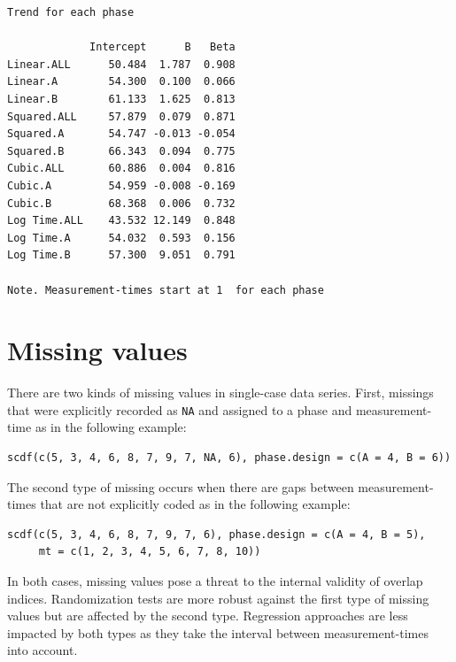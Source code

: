 \documentclass[
]{book}
\begin{document}
\begin{verbatim}
Trend for each phase

             Intercept      B   Beta
Linear.ALL      50.484  1.787  0.908
Linear.A        54.300  0.100  0.066
Linear.B        61.133  1.625  0.813
Squared.ALL     57.879  0.079  0.871
Squared.A       54.747 -0.013 -0.054
Squared.B       66.343  0.094  0.775
Cubic.ALL       60.886  0.004  0.816
Cubic.A         54.959 -0.008 -0.169
Cubic.B         68.368  0.006  0.732
Log Time.ALL    43.532 12.149  0.848
Log Time.A      54.032  0.593  0.156
Log Time.B      57.300  9.051  0.791

Note. Measurement-times start at 1  for each phase
\end{verbatim}

\hypertarget{missing-values}{%
\section{Missing values}\label{missing-values}}

There are two kinds of missing values in single-case data series. First, missings that were explicitly recorded as \texttt{NA} and assigned to a phase and measurement-time as in the following example:

\begin{verbatim}
scdf(c(5, 3, 4, 6, 8, 7, 9, 7, NA, 6), phase.design = c(A = 4, B = 6))
\end{verbatim}

The second type of missing occurs when there are gaps between measurement-times that are not explicitly coded as in the following example:

\begin{verbatim}
scdf(c(5, 3, 4, 6, 8, 7, 9, 7, 6), phase.design = c(A = 4, B = 5), 
     mt = c(1, 2, 3, 4, 5, 6, 7, 8, 10))
\end{verbatim}

In both cases, missing values pose a threat to the internal validity of overlap indices. Randomization tests are more robust against the first type of missing values but are affected by the second type. Regression approaches are less impacted by both types as they take the interval between measurement-times into account.
\end{document}
